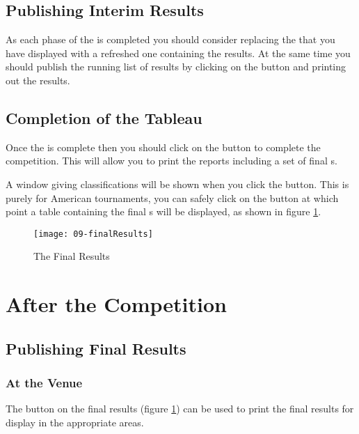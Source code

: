 \documentclass[a4paper,11pt]{memoir}
\begin{document}
\section{Publishing Interim Results}

As each phase of the  is completed you should consider replacing the  that you have displayed with a refreshed one containing the results. At the same time you should publish the running list of results by clicking on the  button and printing out the results. 

\section{Completion of the Tableau}

Once the  is complete then you should click on the  button to complete the competition. This will allow you to print the reports including a set of final s. 

A window giving classifications will be shown when you click the  button. This is purely for American tournaments, you can safely click on the  button at which point a table containing the final s will be displayed, as shown in figure \ref{fig:09-finalResults}.

\begin{figure}[!ht]
 \centering
 \texttt{[image: 09-finalResults]}
 \caption{The Final Results} \label{fig:09-finalResults}
\end{figure}

\chapter{After the Competition}

\section{Publishing Final Results}

\subsection{At the Venue}

The  button on the final results (figure \ref{fig:09-finalResults}) can be used to print the final results for display in the appropriate areas. 
\end{document}

